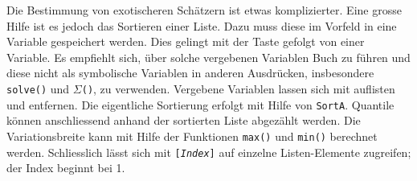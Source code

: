 \documentclass[a4paper,11pt,notitlepage,halfparskip,headsepline,normalheadings,twoside]{scrartcl}
\newlength{\tikey}
\newcommand{\keystroke}[1]{\settowidth{\tikey}{\scriptsize #1}\psframebox[framearc=0.2]{\parbox{\tikey}{\scriptsize\textsf{#1}}}}
\begin{document}
\begin{window}
Die Bestimmung von exotischeren Schätzern ist etwas komplizierter. Eine grosse
Hilfe ist es jedoch das Sortieren einer Liste. Dazu muss diese im Vorfeld in
eine Variable gespeichert werden. Dies gelingt mit der Taste
\keystroke{STO$\blacktriangleright$} gefolgt von einer Variable. Es empfiehlt
sich, über solche vergebenen Variablen Buch zu führen und diese nicht als
symbolische Variablen in anderen Ausdrücken, insbesondere \texttt{solve()} und
\texttt{$\Sigma$()}, zu verwenden. Vergebene Variablen lassen sich mit
\keystroke{VAR-LINK} auflisten und entfernen. Die eigentliche Sortierung erfolgt mit Hilfe
von \texttt{SortA}. Quantile können anschliessend anhand der sortierten Liste
abgezählt werden. Die Variationsbreite kann mit Hilfe der Funktionen
\texttt{max()} und \texttt{min()} berechnet werden. Schliesslich lässt sich mit
\texttt{[\textit{Index}]} auf einzelne Listen-Elemente zugreifen; der Index beginnt bei 1.
\end{window}
\end{document}
